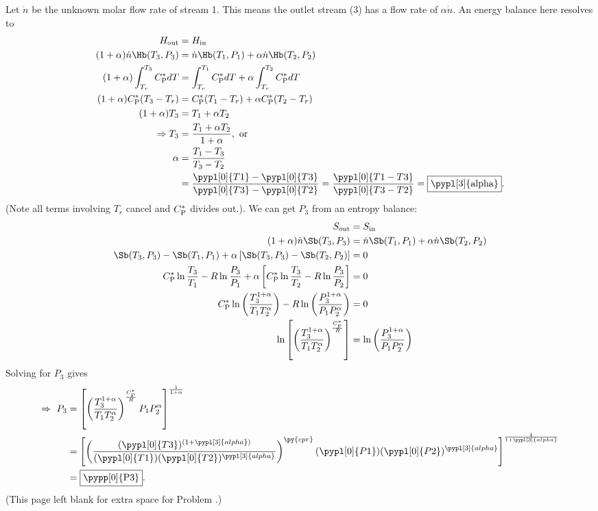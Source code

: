 Let $\dot{n}$ be the unknown molar flow rate of stream 1.  This means the outlet stream (3) has a flow rate of $\alpha\dot{n}$.  An energy balance here resolves to 
\begin{align*}
H_{\rm out} & = H_{\rm in}\\
(1+\alpha) \dot{n} \Hb(T_3,P_3) & = \dot{n}\Hb(T_1,P_1) + \alpha\dot{n} \Hb(T_2,P_2)\\
(1+\alpha)  \int_{T_r}^{T_3} C^*_{\rm P} dT & = \int_{T_r}^{T_1} C^*_{\rm P}dT + \alpha\int_{T_r}^{T_2} C^*_{\rm P}dT\\
(1+\alpha)C^*_{\rm P}(T_3-T_r) & = C^*_{\rm P}(T_1-T_r) + \alpha C^*_{\rm P}(T_2-T_r)\\
(1+\alpha)T_3 & = T_1 + \alpha T_2\\
\Rightarrow T_3 & = \frac{T_1+\alpha T_2}{1+\alpha},\ \mbox{or}\\
\alpha & = \frac{T_1-T_3}{T_3-T_2}\\
  & = \frac{\pypl[0]{T1}-\pypl[0]{T3}}{\pypl[0]{T3}-\pypl[0]{T2}} = \frac{\pypl[0]{T1-T3}}{\pypl[0]{T3-T2}} = \fbox{\pypl[3]{alpha}}.
\end{align*}
(Note all terms involving $T_r$ cancel and $C^*_{\rm P}$ divides out.).  We can get $P_3$ from an entropy balance:
\begin{align*}
S_{\rm out} & = S_{\rm in}\\
(1+\alpha)\dot{n} \Sb (T_3,P_3) & = \dot{n}\Sb(T_1,P_1) + \alpha\dot{n} \Sb(T_2,P_2)\\
\Sb(T_3,P_3) - \Sb(T_1,P_1) + \alpha\left[\Sb(T_3,P_3)-\Sb(T_2,P_2)\right] & = 0\\
C^*_{\rm P}\ln\frac{T_3}{T_1} - R\ln\frac{P_3}{P_1} + \alpha\left[C^*_{\rm P}\ln\frac{T_3}{T_2}-R\ln\frac{P_3}{P_2}\right] & = 0\\
C^*_{\rm P}\ln\left(\frac{T_3^{1+\alpha}}{T_1T_2^\alpha}\right) - R\ln\left(\frac{P_3^{1+\alpha}}{P_1P_2^\alpha}\right) & = 0\\
\ln\left[\left(\frac{T_3^{1+\alpha}}{T_1T_2^\alpha}\right)^{\frac{C^*_{\rm P}}{R}}\right] & = \ln\left(\frac{P_3^{1+\alpha}}{P_1P_2^\alpha}\right)
\end{align*}
Solving for $P_3$ gives
\begin{align*}
\Rightarrow\ P_3 & = \left[\left(\frac{T_3^{1+\alpha}}{T_1T_2^\alpha}\right)^{\frac{C^*_{\rm P}}{R}}P_1P_2^\alpha\right]^{\frac{1}{1+\alpha}}\\
& = \left[\left(\frac{(\pypl[0]{T3})^{(1+\pypl[3]{alpha})}}{(\pypl[0]{T1}) (\pypl[0]{T2})^{\pypl[3]{alpha}}}\right)^{\py{cpr}} (\pypl[0]{P1}) (\pypl[0]{P2})^{\pypl[3]{alpha}}\right]^{\frac{1}{1+\pypl[3]{alpha}}} \\
& = \fbox{\pypp[0]{P3}}.
\end{align*}
\clearpage
\else
\ifgivespace
\clearpage
\noindent (This page left blank for extra space for Problem \theenumi.)
\clearpage
\fi
\fi
